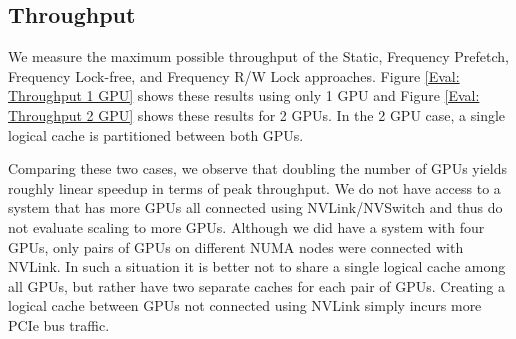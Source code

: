 \subsection{Throughput}
We measure the maximum possible throughput of the Static, Frequency Prefetch, Frequency Lock-free, and Frequency R/W Lock approaches.
Figure \ref{Eval: Throughput 1 GPU} shows these results using only 1 GPU and Figure \ref{Eval: Throughput 2 GPU} shows these results for 2 GPUs. In the 2 GPU case, a single logical cache is partitioned between both GPUs.  

Comparing these two cases, we observe that doubling the number of GPUs yields roughly linear speedup in terms of peak throughput. We do not have access to a system that has more GPUs all connected using NVLink/NVSwitch and thus do not evaluate scaling to more GPUs. Although we did have a system with four GPUs, only pairs of GPUs on different NUMA nodes were connected with NVLink. In such a situation it is better not to share a single logical cache among all GPUs, but rather have two separate caches for each pair of GPUs. Creating a logical cache between GPUs not connected using NVLink simply incurs more PCIe bus traffic.

